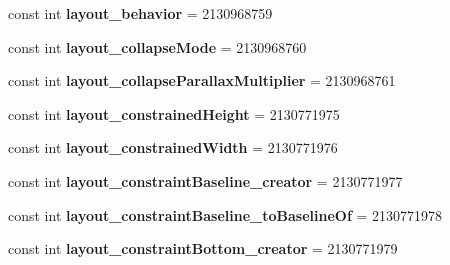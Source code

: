 \begin{DoxyCompactItemize}
\item 
\mbox{\label{classst_delivery_1_1_resource_1_1_attribute_a61bf9f54c28c3fdd73bd049dcaa0dc9d}} 
const int {\bfseries layout\+\_\+behavior} = 2130968759
\item 
\mbox{\label{classst_delivery_1_1_resource_1_1_attribute_a0bbd759b4abb2516b10b60c96659acba}} 
const int {\bfseries layout\+\_\+collapse\+Mode} = 2130968760
\item 
\mbox{\label{classst_delivery_1_1_resource_1_1_attribute_a6b000fd93ecb2571f6d1d5edcf9ae54d}} 
const int {\bfseries layout\+\_\+collapse\+Parallax\+Multiplier} = 2130968761
\item 
\mbox{\label{classst_delivery_1_1_resource_1_1_attribute_a5a7cbea48ca07def33b6e0645e2de537}} 
const int {\bfseries layout\+\_\+constrained\+Height} = 2130771975
\item 
\mbox{\label{classst_delivery_1_1_resource_1_1_attribute_ae724e9a49de7c6f2f678f0620088aa1e}} 
const int {\bfseries layout\+\_\+constrained\+Width} = 2130771976
\item 
\mbox{\label{classst_delivery_1_1_resource_1_1_attribute_a9159bbb2875a0b56058530c678ae435d}} 
const int {\bfseries layout\+\_\+constraint\+Baseline\+\_\+creator} = 2130771977
\item 
\mbox{\label{classst_delivery_1_1_resource_1_1_attribute_a5561b5372025a0396794e4cec3d87065}} 
const int {\bfseries layout\+\_\+constraint\+Baseline\+\_\+to\+Baseline\+Of} = 2130771978
\item 
\mbox{\label{classst_delivery_1_1_resource_1_1_attribute_a3dcce9cbf8c2d7908d1cf96e514f8abf}} 
const int {\bfseries layout\+\_\+constraint\+Bottom\+\_\+creator} = 2130771979
\item 
\mbox{\label{classst_delivery_1_1_resource_1_1_attribute_a8a84249a16769ef4b1854efb22679856}} 

\end{DoxyCompactItemize}
